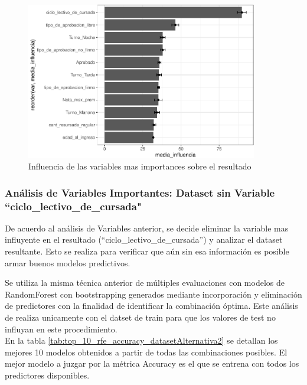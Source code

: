 \begin{figure}[!htb]
	\centering
	\includegraphics[width=0.9\textwidth]{imagenes/variables/influencia_de_variables-1.pdf}
	\caption{Influencia de las variables mas importances sobre el resultado}
	\label{fig:rfe_influencia_var}
\end{figure}

\FloatBarrier


\subsubsection{\textbf{Análisis de Variables Importantes:} Dataset sin Variable ``ciclo\_lectivo\_de\_cursada"}\label{analisis-var_importantes-2}

De acuerdo al análisis de Variables anterior, se decide eliminar la variable mas influyente en el resultado (``ciclo\_lectivo\_de\_cursada'') y analizar el dataset resultante. Esto se realiza para verificar que aún sin esa información es posible armar buenos modelos predictivos.

Se utiliza la misma técnica anterior de múltiples evaluaciones con  modelos de RandomForest con bootstrapping generados mediante incorporación y eliminación de predictores con la finalidad de identificar la combinación óptima. Este análisis de realiza unicamente con el datset de train para que los valores de test no influyan en este procedimiento.\\

En la tabla \ref{tab:top_10_rfe_accuracy_datasetAlternativa2} se detallan los mejores 10 modelos obtenidos a partir de todas las combinaciones posibles. El mejor modelo a juzgar por la métrica Accuracy es el que se entrena con todos los predictores disponibles.

